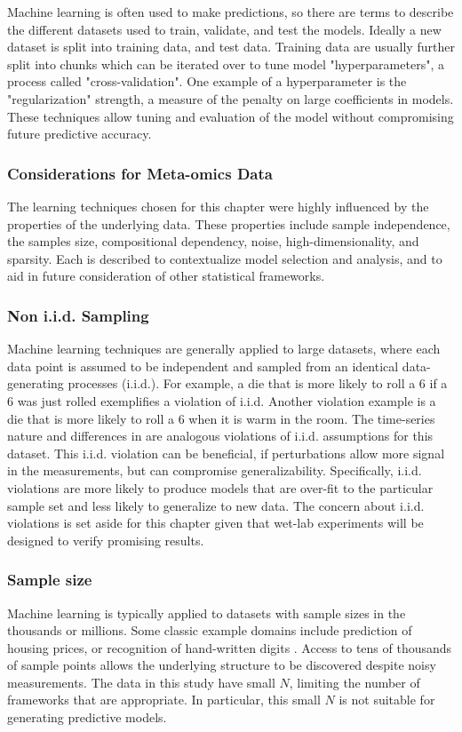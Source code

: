 Machine learning is often used to make predictions, so there are terms to describe the different datasets used to train, validate, and test the models.
Ideally a new dataset is split into training data, and test data.
Training data are usually further split into chunks which can be iterated over to tune model "hyperparameters", a process called "cross-validation".
One example of a hyperparameter is the "regularization" strength, a measure of the penalty on large coefficients in models. %
These techniques allow tuning and evaluation of the model without compromising future predictive accuracy.

\subsubsection{Considerations for Meta-omics Data}

The learning techniques chosen for this chapter were highly influenced by the properties of the underlying data.
These properties include sample independence, the samples size, compositional dependency, noise, high-dimensionality, and sparsity.
Each is described to contextualize model selection and analysis, and to aid in future consideration of other statistical frameworks.

\subsubsection{Non i.i.d. Sampling}
Machine learning techniques are generally applied to large datasets, where each data point is assumed to be independent and sampled from an identical data-generating processes (i.i.d.).
For example, a die that is more likely to roll a 6 if a 6 was just rolled exemplifies a violation of i.i.d.
Another violation example is a die that is more likely to roll a 6 when it is warm in the room.
The time-series nature and differences in  are analogous violations of i.i.d. assumptions for this dataset.
This i.i.d. violation can be beneficial, if perturbations allow more signal in the measurements, but can compromise generalizability.
Specifically, i.i.d. violations are more likely to produce models that are over-fit to the particular sample set and less likely to generalize to new data.
The concern about i.i.d. violations is set aside for this chapter given that wet-lab experiments will be designed to verify promising results.

\subsubsection{Sample size}
Machine learning is typically applied to datasets with sample sizes in the thousands or millions.
Some classic example domains include prediction of housing prices, or recognition of hand-written digits \cite{friedman2001}.
Access to tens of thousands of sample points allows the underlying structure to be discovered despite noisy measurements.
The data in this study have small $N$, limiting the number of frameworks that are appropriate.
In particular, this small $N$ is not suitable for generating predictive models.

